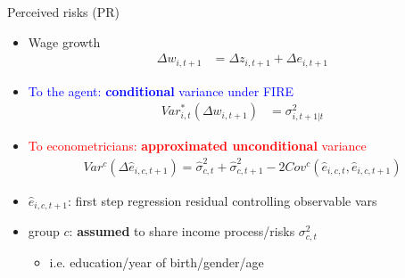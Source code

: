 \documentclass{beamer}
\begin{document}
\begin{frame}{Perceived risks (PR)}
	\begin{itemize}
		\item Wage growth 
		\begin{equation*}
			\begin{split}
				\Delta w_{i,t+1} & =\Delta z_{i,t+1} +\Delta e_{i,t+1} 
			\end{split}
		\end{equation*}
		\item \textcolor{blue}{To the agent: \textbf{conditional} variance under FIRE}
		\begin{equation*}
			\begin{split}
				Var^*_{i,t}(\Delta w_{i,t+1}) & =\sigma^2_{i,t+1|t}
			\end{split}
		\end{equation*}
		\item \textcolor{red}{To econometricians: \textbf{approximated unconditional} variance} 
		\begin{equation*}
			\begin{split}
				Var^c(\Delta \hat e_{i,c,t+1})     = \hat\sigma^2_{c,t}+ \hat\sigma^2_{c,t+1} - 2Cov^c(\hat e_{i,c,t},\hat e_{i,c,t+1})
			\end{split}
		\end{equation*}
	\item $\hat e_{i,c,t+1}$: first step regression residual controlling observable vars
	\item group $c$: \textbf{assumed} to share income process/risks $\sigma^2_{c,t}$
	\begin{itemize}
		\item i.e. education/year of birth/gender/age
	\end{itemize}
		
	\end{itemize}	
\end{frame}
\end{document}
